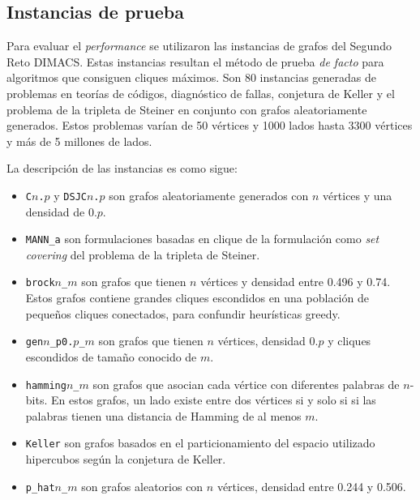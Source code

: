 \documentclass[conference]{IEEEtran}
\begin{document}
\subsection{Instancias de prueba}
\label{sec:aco}

Para evaluar el \emph{performance} se utilizaron las instancias de
grafos del Segundo Reto DIMACS. Estas instancias resultan el método de
prueba \emph{de facto} para algoritmos que consiguen cliques
máximos. Son 80 instancias generadas de problemas en teorías de
códigos, diagnóstico de fallas, conjetura de Keller y el problema de
la tripleta de Steiner en conjunto con grafos aleatoriamente
generados.  Estos problemas varían de 50 vértices y 1000 lados hasta
3300 vértices y más de 5 millones de lados.

La descripción de las instancias es como sigue:

\begin{itemize}
\item \texttt{C$n$.$p$} y \texttt{DSJC$n$.$p$} son grafos
  aleatoriamente generados con $n$ vértices y una densidad de $0.p$.

\item \texttt{MANN\_a} son formulaciones basadas en clique de la
  formulación como \emph{set covering} del problema de la tripleta de
  Steiner.
\item \texttt{brock$n$\_$m$} son grafos que tienen $n$ vértices y
  densidad entre 0.496 y 0.74.  Estos grafos contiene grandes cliques
  escondidos en una población de pequeños cliques conectados, para
  confundir heurísticas greedy.
\item \texttt{gen$n$\_p0.$p$\_$m$} son grafos que tienen $n$ vértices,
  densidad $0.p$ y cliques escondidos de tamaño conocido de $m$.

\item \texttt{hamming$n$\_$m$} son grafos que asocian cada vértice con
  diferentes palabras de $n$-bits. En estos grafos, un lado existe
  entre dos vértices si y solo si si las palabras tienen una distancia
  de Hamming de al menos $m$.
\item \texttt{Keller} son grafos basados en el particionamiento del
  espacio utilizado hipercubos según la conjetura de Keller.
\item \texttt{p\_hat$n$\_$m$} son grafos aleatorios con $n$ vértices,
  densidad entre 0.244 y 0.506.

\end{itemize}
\end{document}
